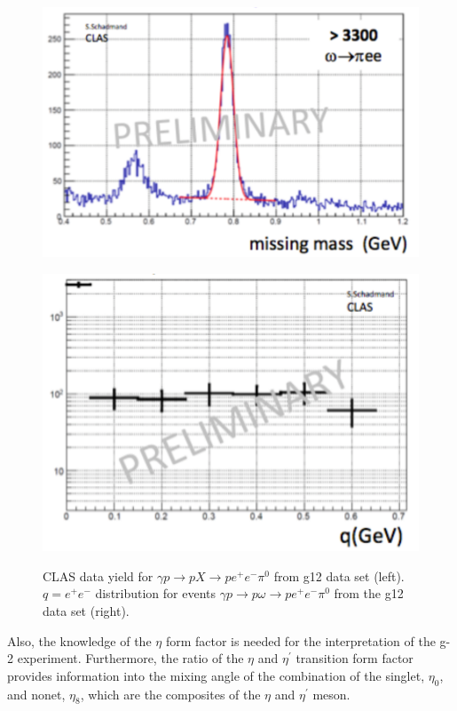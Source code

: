 \documentclass{aip-cp}
\begin{document}
\begin{figure}[h!]
	\begin{minipage}{.5\textwidth}
		\centering
		\centerline{\includegraphics[width=175 pt]{figures/clas_omega_ff.pdf}}
		\caption{}{}
		\label{fig:clas_omega_ff}
	\end{minipage}%
	\begin{minipage}{.5\textwidth}
		\centering
		\centerline{\includegraphics[width=165 pt]{figures/clas_omega_ff_q.pdf}}
		\caption{CLAS data yield for $\gamma p \to p X \to p e^+ e^- \pi^0 $ from g12 data set (left). $q=e^+ e^-$ distribution for events  $\gamma p \to p \omega \to p e^+ e^- \pi^0 $ from the g12 data set (right).}{}
		\label{fig:clas_omega_ff_q}
	\end{minipage}
\end{figure}
Also, the knowledge of the $\eta$ form factor is needed for the interpretation of the g-2 experiment. Furthermore, the ratio of the $\eta$ and $\eta^{\prime}$ transition form factor provides information into the mixing angle of the combination of the singlet, $\eta_0$, and nonet, $\eta_8$, which are the composites of the $\eta$ and $\eta^{\prime}$ meson.
\newpage
\end{document}

